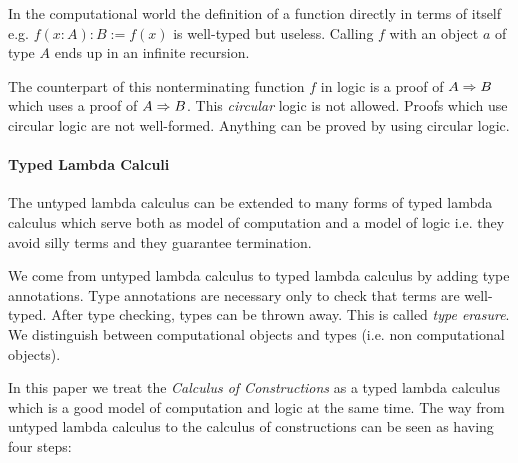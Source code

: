 In the computational world the definition of a function directly in terms of
itself e.g.  $f(x: A): B := f(x)$ is well-typed but useless. Calling $f$ with an
object $a$ of type $A$ ends up in an infinite recursion.

The counterpart of this nonterminating function $f$ in logic is a proof of $A
\Rightarrow B$ which uses a proof of $A \Rightarrow B$. This \emph{circular} logic is not
allowed. Proofs which use circular logic are not well-formed. Anything can be
proved by using circular logic.




\paragraph{Typed Lambda Calculi}
The untyped lambda calculus can be extended to many forms of typed lambda
calculus which serve both as model of computation and a model of logic i.e.
they avoid silly terms and they guarantee termination.

We come from untyped lambda calculus to typed lambda calculus by adding type
annotations. Type annotations are necessary only to check that terms are
well-typed. After type checking, types can be thrown away. This is called
\emph{type erasure}. We distinguish between computational objects and types
(i.e. non computational objects).

In this paper we treat the \emph{Calculus of Constructions} as a typed
lambda calculus which is a good model of computation and logic at the same time.
The way from untyped lambda calculus to the calculus of constructions can be
seen as having four steps:




